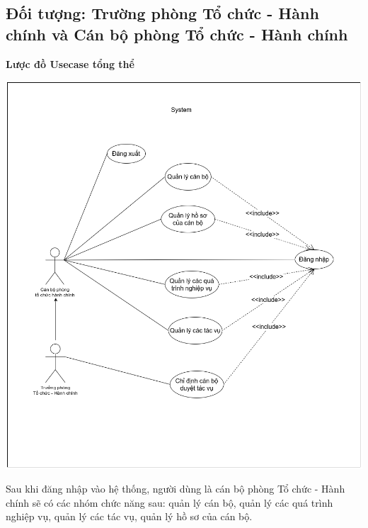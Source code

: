 \subsection{Đối tượng: Trường phòng Tổ chức - Hành chính và Cán bộ phòng Tổ chức - Hành chính}
\textbf{Lược đồ Usecase tổng thể}
\begin{center}
  \captionsetup{type=figure}
  \includegraphics[scale=0.5]{img/UML/TchcStaff/Admin.png}
\end{center}

Sau khi đăng nhập vào hệ thống, người dùng là cán bộ phòng Tổ chức - Hành chính sẽ có các nhóm chức năng sau: quản lý cán bộ, quản lý các quá trình nghiệp vụ, quản lý các tác vụ, quản lý hồ sơ của cán bộ.

